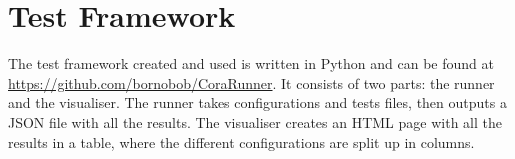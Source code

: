 \chapter{Test Framework}\label{results}
The test framework created and used is written in Python and can be found at \url{https://github.com/bornobob/CoraRunner}. It consists of two parts: the runner and the visualiser. The runner takes configurations and tests files, then outputs a JSON file with all the results. The visualiser creates an HTML page with all the results in a table, where the different configurations are split up in columns. 